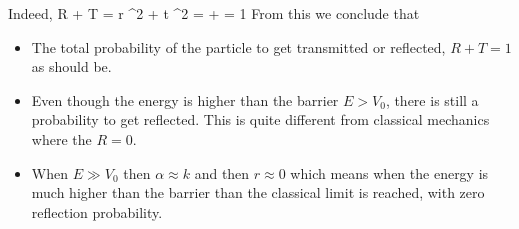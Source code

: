 \documentclass{Textbook}
\begin{document}
Indeed,
\be
R + T = \vert r \vert ^2 + \vert t \vert ^2 =  +  = 1 
\ee
From this we conclude that
\begin{itemize}
\item The total probability of the particle to get transmitted or reflected, $R+T=1$ as should be.
\item Even though the energy is higher than the barrier $E>V_0$, there is still a probability to get reflected. This is quite different from classical mechanics where the $R=0$.
\item When $E\gg V_0$ then $\alpha \approx k$ and then $r\approx 0$ which means when the energy is much higher than the barrier than the classical limit is reached, with zero reflection probability.
\end{itemize}
\end{document}
